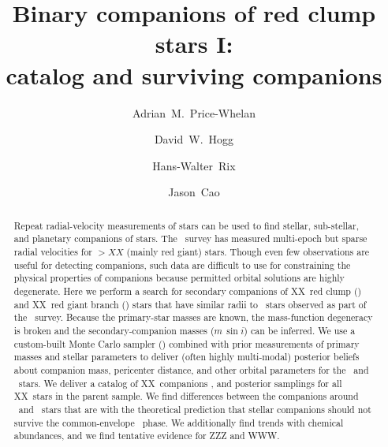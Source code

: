 \documentclass[modern, letterpaper]{aastex61}
\newcommand{\apogee}{\project{\acronym{APOGEE}}}
\newcommand{\thejoker}{\project{The~Joker}}
\newcommand{\RC}{\acronym{RC}}
\newcommand{\RGB}{\acronym{RGB}}
\newcommand{\nRC}{XX}
\newcommand{\nRGB}{XX}
\newcommand{\ntotal}{XX}
\newcommand{\ncompanions}{XX}
\begin{document}
\sloppy\sloppypar\raggedbottom\frenchspacing %

\title{Binary companions of red clump stars I: \\
       catalog and surviving companions}

\author[0000-0003-0872-7098]{Adrian~M.~Price-Whelan}

\author[0000-0003-2866-9403]{David~W.~Hogg}

\author{Hans-Walter~Rix}

\author{Jason~Cao}

\begin{abstract}\noindent %
Repeat radial-velocity measurements of stars can be used to find stellar,
sub-stellar, and planetary companions of stars.
The \apogee\ survey has measured multi-epoch but sparse radial velocities for
$> XX$ (mainly red giant) stars.
Though even few observations are useful for detecting companions, such data are
difficult to use for constraining the physical properties of companions because
permitted orbital solutions are highly degenerate.
Here we perform a search for secondary companions of \nRC\ red clump (\RC) and
\nRGB\ red giant branch (\RGB) stars that have similar radii to \RC\ stars
observed as part of the \apogee\ survey.
Because the primary-star masses are known, the mass-function degeneracy is
broken and the secondary-companion masses ($m\,\sin i$) can be inferred.
We use a custom-built Monte Carlo sampler (\thejoker) combined with prior
measurements of primary masses and stellar parameters to deliver (often highly
multi-modal) posterior beliefs about companion mass, pericenter distance, and
other orbital parameters for the \RC\ and \RGB\ stars.
We deliver a catalog of \ncompanions\ companions ,
and posterior samplings for all \ntotal\ stars in the parent sample.
We find  differences between the companions around \RC\ and \RGB\
stars that are  with the theoretical prediction that
stellar companions should not survive the common-envelope \RGB\ phase.
We additionally find trends with chemical abundances, and we find tentative
evidence for ZZZ and WWW.
\end{abstract}
\end{document}
